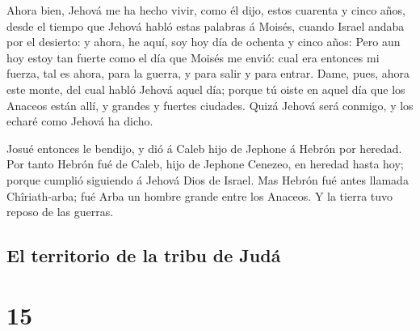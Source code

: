  Ahora bien, Jehová me ha hecho vivir, como él dijo,
estos cuarenta y cinco años, desde el tiempo que Jehová habló estas
palabras á Moisés, cuando Israel andaba por el desierto: y ahora, he
aquí, soy hoy día de ochenta y cinco años:  Pero aun hoy
estoy tan fuerte como el día que Moisés me envió: cual era entonces mi
fuerza, tal es ahora, para la guerra, y para salir y para entrar.
 Dame, pues, ahora este monte, del cual habló Jehová
aquel día; porque tú oiste en aquel día que los Anaceos están allí, y
grandes y fuertes ciudades. Quizá Jehová será conmigo, y los echaré como
Jehová ha dicho.

 Josué entonces le bendijo, y dió á Caleb hijo de Jephone
á Hebrón por heredad.  Por tanto Hebrón fué de Caleb,
hijo de Jephone Cenezeo, en heredad hasta hoy; porque cumplió siguiendo
á Jehová Dios de Israel.  Mas Hebrón fué antes llamada
Chîriath-arba; fué Arba un hombre grande entre los Anaceos. Y la tierra
tuvo reposo de las guerras.

\hypertarget{el-territorio-de-la-tribu-de-juduxe1}{%
\subsection{El territorio de la tribu de
Judá}\label{el-territorio-de-la-tribu-de-juduxe1}}

\hypertarget{section-14}{%
\section{15}\label{section-14}}

